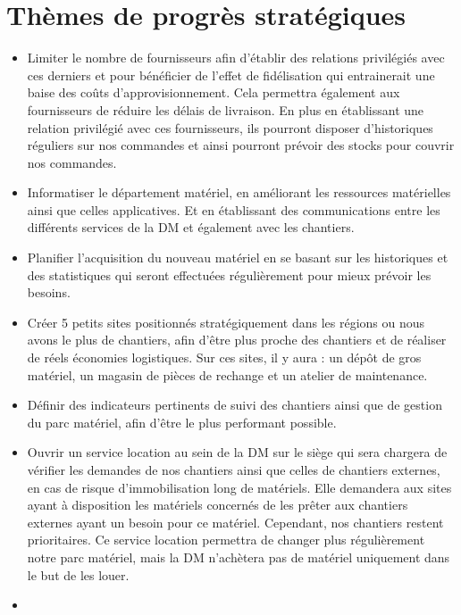 \section{Thèmes de progrès stratégiques}
        \begin{itemize}
                \item Limiter le nombre de fournisseurs afin d'établir des relations privilégiés avec ces derniers et pour bénéficier de l'effet de fidélisation qui entrainerait une baise des coûts d'approvisionnement. Cela permettra également aux fournisseurs de réduire les délais de livraison. En plus en établissant une relation privilégié avec ces fournisseurs, ils pourront disposer d'historiques réguliers sur nos commandes et ainsi pourront prévoir des stocks pour couvrir nos commandes.
                \item Informatiser le département matériel, en améliorant les ressources matérielles ainsi que celles applicatives. Et en établissant des communications entre les différents services de la DM et également avec les chantiers.
                \item Planifier l'acquisition du nouveau matériel en se basant sur les historiques et des statistiques qui seront effectuées régulièrement pour mieux prévoir les besoins.
                \item Créer 5 petits sites positionnés stratégiquement dans les régions ou nous avons le plus de chantiers, afin d'être plus proche des chantiers et de réaliser de réels économies logistiques. Sur ces sites, il y aura : un dépôt de gros matériel, un magasin de pièces de rechange et un atelier de maintenance.
                \item Définir des indicateurs pertinents de suivi des chantiers ainsi que de gestion du parc matériel, afin d'être le plus performant possible.
                \item Ouvrir un service location au sein de la DM sur le siège qui sera chargera de vérifier les demandes de nos chantiers ainsi que celles de chantiers externes, en cas de risque d'immobilisation long de matériels. Elle demandera aux sites ayant à disposition les matériels concernés de les prêter aux chantiers externes ayant un besoin pour ce matériel. Cependant, nos chantiers restent prioritaires. Ce service location permettra de changer plus régulièrement notre parc matériel, mais la DM n'achètera pas de matériel uniquement dans le but de les louer.
                \item 
        \end{itemize}


